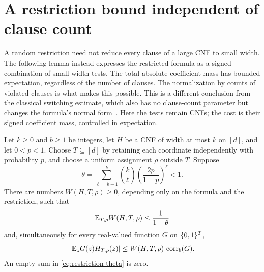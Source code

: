 \section{A restriction bound independent of clause count}
\label{sec:restriction}

A random restriction need not reduce every clause of a large CNF to small
width.  The following lemma instead expresses the restricted formula as a
signed combination of small-width tests.  The total absolute coefficient
mass has bounded expectation, regardless of the number of clauses.  The
normalization by counts of violated clauses is what makes this possible.
This is a different conclusion from the classical switching estimate,
which also has no clause-count parameter but changes the formula's
normal form~\cite[Section~3, Main Lemma]{H89}.  Here the tests remain CNFs;
the cost is their signed coefficient mass, controlled in expectation.

\begin{lemma}\label{lem:restriction}
Let $k\geq0$ and $b\geq1$ be integers, let $H$ be a CNF of width at most
$k$ on $[d]$, and let $0<p<1$.  Choose $T\subseteq[d]$ by retaining each
coordinate independently with probability $p$, and choose a uniform
assignment $\rho$ outside $T$.  Suppose
\begin{equation}\label{eq:restriction-theta}
  \theta=\sum_{\ell=b+1}^{k}\binom{k}{\ell}
                  \left(\frac{2p}{1-p}\right)^{\ell}<1.
\end{equation}
There are numbers $W(H,T,\rho)\geq 0$, depending only on the formula and
the restriction, such that
\begin{equation}\label{eq:restriction-cost}
  \mathbb E_{T,\rho}W(H,T,\rho)\leq\frac{1}{1-\theta}
\end{equation}
and, simultaneously for every real-valued function $G$ on $\{0,1\}^T$,
\begin{equation}\label{eq:restriction-correlation}
  \left|\mathbb E_z G(z)H_{T,\rho}(z)\right|
       \leq W(H,T,\rho)\,\operatorname{corr}_b(G).
\end{equation}
An empty sum in \eqref{eq:restriction-theta} is zero.
\end{lemma}

